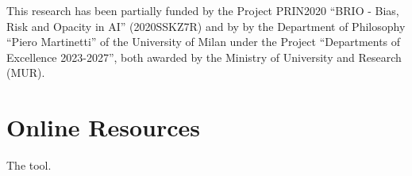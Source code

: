 \documentclass[
]{ceurart}
\begin{document}

%
%
%


\begin{acknowledgments}
This research has been partially funded by the Project PRIN2020 ``BRIO - Bias, Risk and Opacity in AI'' (2020SSKZ7R) and by by the Department of Philosophy ``Piero Martinetti'' of the University of Milan under the Project ``Departments of Excellence 2023-2027'', both awarded by the Ministry of University and Research (MUR).
\end{acknowledgments}



\appendix

\section{Online Resources}
The tool.
\end{document}
